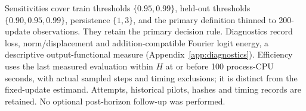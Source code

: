 Sensitivities cover train thresholds $\{0.95,0.99\}$, held-out thresholds $\{0.90,0.95,0.99\}$, persistence $\{1,3\}$, and the primary definition thinned to 200-update observations. They retain the primary decision rule. Diagnostics record loss, norm/displacement and addition-compatible Fourier logit energy, a descriptive output-functional measure (Appendix~\ref{app:diagnostics}). Efficiency uses the last measured evaluation within $H$ at or before 100 process-CPU seconds, with actual sampled steps and timing exclusions; it is distinct from the fixed-update estimand. Attempts, historical pilots, hashes and timing records are retained. No optional post-horizon follow-up was performed.

